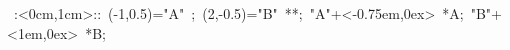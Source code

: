 \hbox{
\xy    <1cm,0cm>:<0cm,1cm>::
       (-1,0.5)="A" ; (2,-0.5)="B" **\dir{-};
       "A"+<-0.75em,0ex> *{A};
       "B"+<1em,0ex> *{B};
       \endxy}
